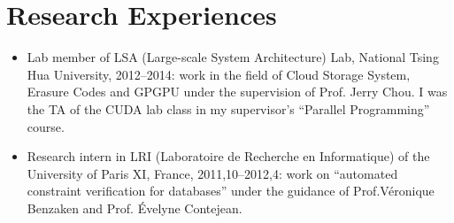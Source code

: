\documentclass[letterpaper]{article}
\begin{document}
\section*{Research Experiences}
\begin{itemize}
    \item Lab member of LSA (Large-scale System Architecture) Lab, National Tsing Hua University, 2012--2014: work in the field of Cloud Storage System, Erasure Codes and GPGPU under the supervision of Prof. Jerry Chou. I was the TA of the CUDA lab class in my supervisor's ``Parallel Programming'' course.
    \item Research intern in LRI (Laboratoire de Recherche en Informatique) of the University of Paris XI, France, 2011,10--2012,4: work on ``automated constraint verification for databases'' under the guidance of Prof.V\'eronique Benzaken and Prof. \'Evelyne Contejean.
% 
% 

\end{itemize}
\end{document}
